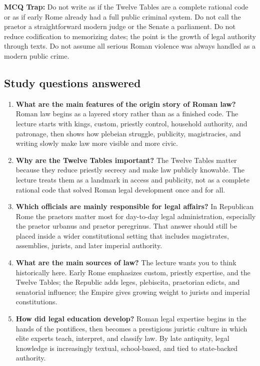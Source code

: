 \documentclass[11pt]{article}
\begin{document}
\begin{quotebox}
\textbf{MCQ Trap:} Do not write as if the Twelve Tables are a complete rational code or as if early Rome already had a full public criminal system. Do not call the praetor a straightforward modern judge or the Senate a parliament. Do not reduce codification to memorizing dates; the point is the growth of legal authority through texts. Do not assume all serious Roman violence was always handled as a modern public crime.
\end{quotebox}

\subsection{Study questions answered}

\begin{enumerate}
\item \textbf{What are the main features of the origin story of Roman law?} Roman law begins as a layered story rather than as a finished code. The lecture starts with kings, custom, priestly control, household authority, and patronage, then shows how plebeian struggle, publicity, magistracies, and writing slowly make law more visible and more civic.
\item \textbf{Why are the Twelve Tables important?} The Twelve Tables matter because they reduce priestly secrecy and make law publicly knowable. The lecture treats them as a landmark in access and publicity, not as a complete rational code that solved Roman legal development once and for all.
\item \textbf{Which officials are mainly responsible for legal affairs?} In Republican Rome the praetors matter most for day-to-day legal administration, especially the praetor urbanus and praetor peregrinus. That answer should still be placed inside a wider constitutional setting that includes magistrates, assemblies, jurists, and later imperial authority.
\item \textbf{What are the main sources of law?} The lecture wants you to think historically here. Early Rome emphasizes custom, priestly expertise, and the Twelve Tables; the Republic adds leges, plebiscita, praetorian edicts, and senatorial influence; the Empire gives growing weight to jurists and imperial constitutions.
\item \textbf{How did legal education develop?} Roman legal expertise begins in the hands of the pontifices, then becomes a prestigious juristic culture in which elite experts teach, interpret, and classify law. By late antiquity, legal knowledge is increasingly textual, school-based, and tied to state-backed authority.

\end{enumerate}
\end{document}
